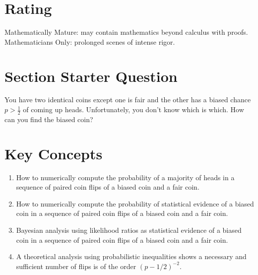\documentclass[12pt]{article}
\begin{document}
\myheader \mytitle

\hr


\hr

\usefirefox

\hr



\section*{Rating} %
Mathematically Mature:  may contain mathematics beyond calculus with
proofs.  \\
Mathematicians Only:  prolonged scenes of intense rigor.

\hr

\section*{Section Starter Question}

You have two identical coins except one is fair and the other has a
biased chance \( p > \frac{1}{2} \) of coming up heads.  Unfortunately,
you don't know which is which.  How can you find the biased coin?

\hr

\section*{Key Concepts}

\begin{enumerate}
    \item
        How to numerically compute the probability of a majority of
        heads in a sequence of paired coin flips of a biased coin and a
        fair coin.
    \item
        How to numerically compute the probability of statistical
        evidence of a biased coin in a sequence of paired coin flips of
        a biased coin and a fair coin.
    \item
        Bayesian analysis using likelihood ratios as statistical
        evidence of a biased coin in a sequence of paired coin flips of
        a biased coin and a fair coin.
    \item
        A theoretical analysis using probabilistic inequalities shows a
        necessary and sufficient number of flips is of the order \( (p-1/2)^
        {-2} \).
\end{enumerate}
\end{document}
